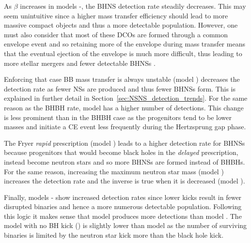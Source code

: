 As $\beta$ increases in models \modBetaLow{}-\modBetaHigh{}, the BHNS detection rate steadily decreases. This may seem unintuitive since a higher mass transfer efficiency should lead to more massive compact objects and thus a more detectable population. However, one must also consider that most of these DCOs are formed through a common envelope event and so retaining more of the envelope during mass transfer means that the eventual ejection of the envelope is much more difficult, thus leading to more stellar mergers and fewer detectable BHNSs \citep[e.g.][]{Kruckow+2018}.


Enforcing that case BB mass transfer is always unstable (model \modCaseBB{}) decreases the detection rate as fewer NSs are produced and thus fewer BHNSs form. This is explained in further detail in Section~\ref{sec:NSNS_detection_trends}. For the same reason as the BHBH rate, model \modOpt{} has a higher number of detections. This change is less prominent than in the BHBH case as the progenitors tend to be lower masses and initiate a CE event less frequently during the Hertzsprung gap phase. 

The Fryer \textit{rapid} prescription (model \modRapid{}) leads to a higher detection rate for BHNSs because progenitors that would become black holes in the \textit{delayed} prescription, instead become neutron stars and so more BHNSs are formed instead of BHBHs. For the same reason, increasing the maximum neutron star mass (model \modNSHigh{}) increases the detection rate and the inverse is true when it is decreased (model \modNSLow{}).

Finally, models \modSigLow{}-\modNoBH{} show increased detection rates since lower kicks result in fewer disrupted binaries and hence a more numerous detectable population. Following this logic it makes sense that model \modSigLower{} produces more detections than model \modSigLow{}. The model with no BH kick (\modNoBH{}) is slightly lower than model \modSigLower{} as the number of surviving binaries is limited by the neutron star kick more than the black hole kick.


